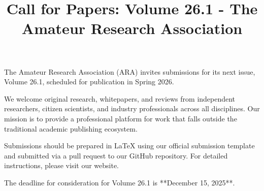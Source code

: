 \documentclass[conference, compsoc, 11pt]{IEEEtran}
\title{Call for Papers: Volume 26.1 - The Amateur Research Association}
\author{
    \IEEEauthorblockN{Ivan Anishchuk}
    \IEEEauthorblockA{
        ivan@ivananishchuk.net https://ivananishchuk.work \\
	ORCID \orcidicon{0009-0008-8729-6137}: 0009-0008-8729-6137 %
    }
}
\begin{document}
\IEEEoverridecommandlockouts
{}

\maketitle

\IEEEpubidadjcol


The Amateur Research Association (ARA) invites submissions for its next issue, Volume 26.1, scheduled for publication in Spring 2026.

We welcome original research, whitepapers, and reviews from independent researchers, citizen scientists, and industry professionals across all disciplines. Our mission is to provide a professional platform for work that falls outside the traditional academic publishing ecosystem.

Submissions should be prepared in LaTeX using our official submission template and submitted via a pull request to our GitHub repository. For detailed instructions, please visit our website.

The deadline for consideration for Volume 26.1 is **December 15, 2025**.
\end{document}
